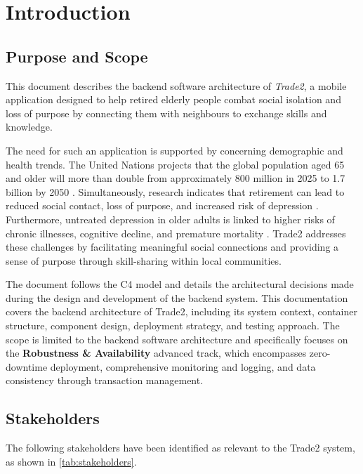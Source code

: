 \section{Introduction}\label{sec:introduction}

\subsection{Purpose and Scope}
This document describes the backend software architecture of \textit{Trade2}, a mobile application designed to help retired elderly people combat social isolation and loss of purpose by connecting them with neighbours to exchange skills and knowledge.

The need for such an application is supported by concerning demographic and health trends. The United Nations projects that the global population aged 65 and older will more than double from approximately 800 million in 2025 to 1.7 billion by 2050 \cite{un-population}. Simultaneously, research indicates that retirement can lead to reduced social contact, loss of purpose, and increased risk of depression \cite{who2023, dang2023}. Furthermore, untreated depression in older adults is linked to higher risks of chronic illnesses, cognitive decline, and premature mortality \cite{chapman2004}. Trade2 addresses these challenges by facilitating meaningful social connections and providing a sense of purpose through skill-sharing within local communities.

The document follows the C4 model and details the architectural decisions made during the design and development of the backend system. This documentation covers the backend architecture of Trade2, including its system context, container structure, component design, deployment strategy, and testing approach. The scope is limited to the backend software architecture and specifically focuses on the \textbf{Robustness \& Availability} advanced track, which encompasses zero-downtime deployment, comprehensive monitoring and logging, and data consistency through transaction management.

\subsection{Stakeholders}
The following stakeholders have been identified as relevant to the Trade2 system, as shown in \cref{tab:stakeholders}.

